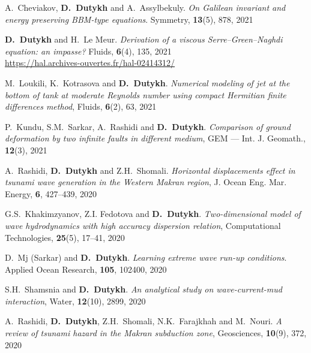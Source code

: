 \begin{etaremune}
  \item A.~Cheviakov, \textbf{D.~Dutykh} and A.~Assylbekuly. \textit{On Galilean invariant and energy preserving BBM-type equations}. Symmetry, \textbf{13}(5), 878, 2021 %
  
  \item \textbf{D.~Dutykh} and H.~Le Meur. \textit{Derivation of a viscous Serre--Green--Naghdi equation: an impasse?} Fluids, \textbf{6}(4), 135, 2021 \\ %
  \url{https://hal.archives-ouvertes.fr/hal-02414312/}
  
  \item M.~Loukili, K.~Kotrasova and \textbf{D.~Dutykh}. \textit{Numerical modeling of jet at the bottom of tank at moderate Reynolds number using compact Hermitian finite differences method}, Fluids, \textbf{6}(2), 63, 2021 %
  
  \item P.~Kundu, S.M.~Sarkar, A.~Rashidi and \textbf{D.~Dutykh}. \textit{Comparison of ground deformation by two infinite faults in different medium}, GEM --- Int. J. Geomath., \textbf{12}(3), 2021 %
  
  
  \item A.~Rashidi, \textbf{D.~Dutykh} and Z.H.~Shomali. \textit{Horizontal displacements effect in tsunami wave generation in the Western Makran region}, J. Ocean Eng. Mar. Energy, \textbf{6}, 427--439, 2020 %
  
  \item G.S.~Khakimzyanov, Z.I. Fedotova and \textbf{D.~Dutykh}. \textit{Two-dimensional model of wave hydrodynamics with high accuracy dispersion relation}, Computational Technologies, \textbf{25}(5), 17--41, 2020 %
  
  \item D.~Mj (Sarkar) and \textbf{D.~Dutykh}. \textit{Learning extreme wave run-up conditions}. Applied Ocean Research, \textbf{105}, 102400, 2020 %
  
  \item S.H.~Shamsnia and \textbf{D.~Dutykh}. \textit{An analytical study on wave-current-mud interaction}, Water, \textbf{12}(10), 2899, 2020 %
  
  \item A.~Rashidi, \textbf{D.~Dutykh}, Z.H.~Shomali, N.K.~Farajkhah and M.~Nouri. \textit{A review of tsunami hazard in the Makran subduction zone}, Geosciences, \textbf{10}(9), 372, 2020 %
  

\end{etaremune}
